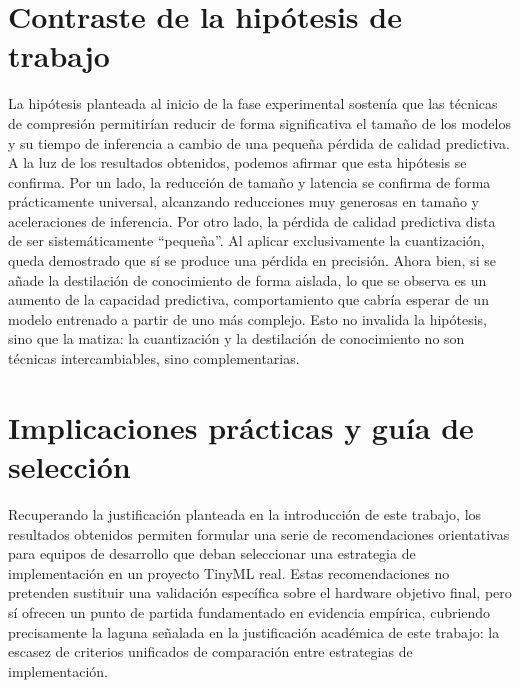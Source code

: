 \documentclass[a4paper,12pt,twoside,final]{book}
\begin{document}
\section{Contraste de la hipótesis de trabajo}
La hipótesis planteada al inicio de la fase experimental sostenía que las técnicas de compresión permitirían reducir
de forma significativa el tamaño de los modelos y su tiempo de inferencia a cambio de una pequeña pérdida de calidad
predictiva. A la luz de los resultados obtenidos, podemos afirmar que esta hipótesis se confirma. Por un lado, la
reducción de tamaño y latencia se confirma de forma prácticamente universal, alcanzando reducciones muy generosas en
tamaño y aceleraciones de inferencia. Por otro lado, la pérdida de calidad predictiva dista de ser sistemáticamente
``pequeña''. Al aplicar exclusivamente la cuantización, queda demostrado que sí se produce una pérdida en precisión.
Ahora bien, si se añade la destilación de conocimiento de forma aislada, lo que se observa es un aumento de la capacidad
predictiva, comportamiento que cabría esperar de un modelo entrenado a partir de uno más complejo. Esto no invalida la
hipótesis, sino que la matiza: la cuantización y la destilación de conocimiento no son técnicas intercambiables, sino
complementarias.
 
\section{Implicaciones prácticas y guía de selección}
Recuperando la justificación planteada en la introducción de este trabajo, los resultados obtenidos permiten formular
una serie de recomendaciones orientativas para equipos de desarrollo que deban seleccionar una estrategia de
implementación en un proyecto TinyML real. Estas recomendaciones no pretenden sustituir una validación específica sobre
el hardware objetivo final, pero sí ofrecen un punto de partida fundamentado en evidencia empírica, cubriendo
precisamente la laguna señalada en la justificación académica de este trabajo: la escasez de criterios unificados de
comparación entre estrategias de implementación.
 
\end{document}
